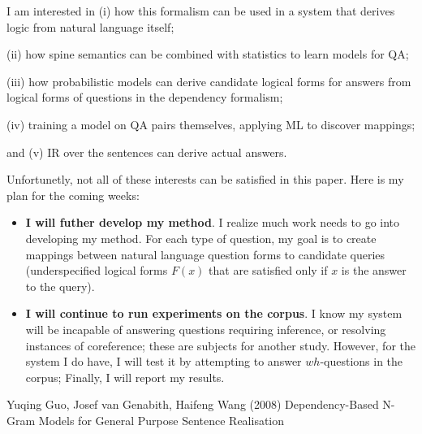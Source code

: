 \documentclass[twoside]{article}
\begin{document}
I am interested in (i) how this formalism can be used in a system that derives logic from natural language itself;

(ii) how spine semantics can be combined with statistics to learn models for QA;

(iii) how probabilistic models can derive candidate logical forms for answers from logical forms of questions in the dependency formalism;

(iv) training a model on QA pairs themselves, applying ML to discover mappings;

and (v) IR over the sentences can derive actual answers.

Unfortunetly, not all of these interests can be satisfied in this paper.  Here is my plan for the coming weeks:

\begin{itemize}

\item \textbf{I will futher develop my method}.  I realize much work needs to go into developing my method.  For each type of question, my goal is to create mappings between natural language question forms to candidate queries (underspecified logical forms $F(x)$ that are satisfied only if $x$ is the answer to the query).

\item \textbf{I will continue to run experiments on the corpus}.  I know my system will be incapable of answering questions requiring inference, or resolving instances of coreference; these are subjects for another study.  However, for the system I do have, I will test it by attempting to answer $wh$-questions in the corpus; Finally, I will report my results.

\end{itemize}


\begin{thebibliography}{9} %

Yuqing Guo, Josef van Genabith, Haifeng Wang (2008)
\newblock Dependency-Based N-Gram Models for
General Purpose Sentence Realisation
 
\end{thebibliography}

\end{document}
